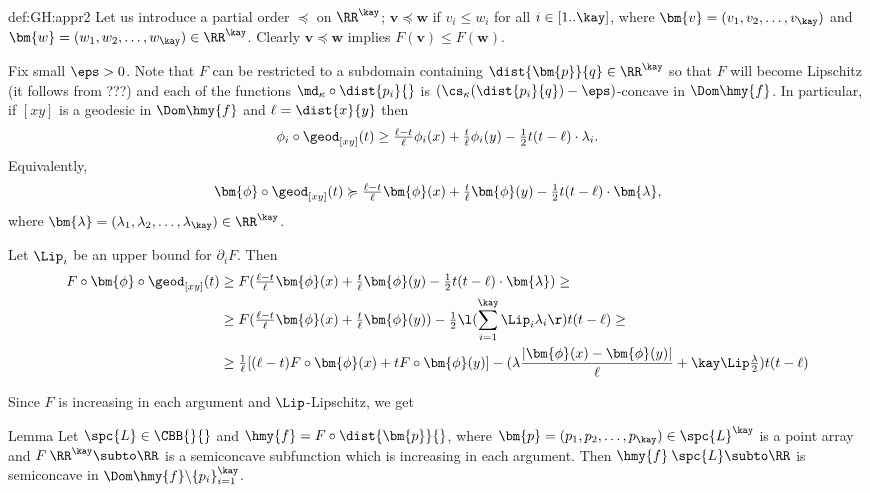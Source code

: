 {\begin{subthm}{def:GH:appr2}
Let us introduce a partial order $\preccurlyeq$ on $\RR^\kay$; 
$\bm{v}\preccurlyeq\bm{w}$ if $v_i\le w_i$ for all $i\in[1..\kay]$,
where $\bm{v}=(v_1,v_2,\dots,v_\kay)$ and $\bm{w}=(w_1,w_2,\dots,w_\kay)\in\RR^\kay$.
Clearly $\bm{v}\preccurlyeq\bm{w}$ implies $F(\bm{v})\le F(\bm{w})$.

Fix small $\eps>0$.
Note that $F$ can be restricted to a subdomain containing $\dist{\bm{p}}{q}\in\RR^\kay$ so that $F$ will become Lipschitz (it follows from ???)
and each of the functions $\md_\kappa\circ\dist{p_i}{}$ is $(\cs_\kappa(\dist{p_i}{q})-\eps)$-concave in $\Dom\hmy{f}$.
In particular, if $[xy]$ is a geodesic in $\Dom\hmy{f}$ and $\ell=\dist{x}{y}$
then
$$\phi_i\circ\geod_{[xy]}(t)
\ge 
\tfrac{\ell-t}{\ell}\phi_i(x)
+
\tfrac{t}{\ell}\phi_i(y)
-
\tfrac12t(t-\ell)\cdot\lambda_i.$$
Equivalently,
$$\bm{\phi}\circ\geod_{[xy]}(t)
\succcurlyeq
\tfrac{\ell-t}{\ell}\bm{\phi}(x)
+
\tfrac{t}{\ell}\bm{\phi}(y)
-
\tfrac12t(t-\ell)\cdot\bm{\lambda},$$
where $\bm{\lambda}=(\lambda_1,\lambda_2,\dots,\lambda_\kay)\in\RR^\kay$.

Let $\Lip_i$ be an upper bound for $\partial_iF$.
Then
\begin{align*}
F\circ\bm{\phi}\circ\geod_{[xy]}(t)
&\ge
F(\tfrac{\ell-t}{\ell}\bm{\phi}(x)
+
\tfrac{t}{\ell}\bm{\phi}(y)
-
\tfrac12t(t-\ell)\cdot\bm{\lambda})
\ge
\\
&
\ge F(\tfrac{\ell-t}{\ell}\bm{\phi}(x)
+
\tfrac{t}{\ell}\bm{\phi}(y))
-
\tfrac12\l(\sum_{i=1}^{\kay}\Lip_i\lambda_i\r) t(t-\ell)
\ge
\\
&\ge
\tfrac1\ell[(\ell-t)F\circ\bm{\phi}(x)
+
tF\circ\bm{\phi}(y)]
-
(\lambda\frac{|\bm{\phi}(x)-\bm{\phi}(y)|}{\ell}+\kay\Lip\tfrac\lambda2) t(t-\ell)
\end{align*}


Since $F$ is increasing in each argument and $\Lip$-Lipschitz, we get


\qeds























\begin{thm}{Lemma}
Let $\spc{L}\in\CBB{}{}$ and 
$\hmy{f}=F\circ\dist{\bm{p}}{}$,
where $\bm{p}=(p_1,p_2,\dots,p_\kay)\in\spc{L}^\kay$ is a point array
and $F\:\RR^\kay\subto\RR$ is a semiconcave subfunction which is increasing in each argument.
Then
$\hmy{f}\:\spc{L}\subto\RR$ is semiconcave in $\Dom\hmy{f}\backslash\{p_i\}_{i=1}^\kay$.


\end{thm}
\end{subthm}}
